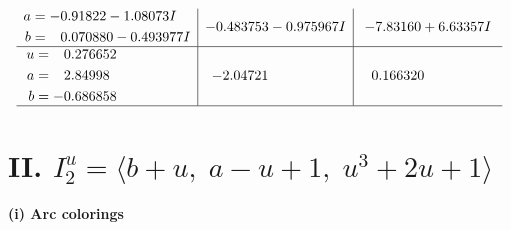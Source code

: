 \documentclass[1p]{elsarticle_modified}
\theoremstyle{definition}
\begin{document}
$$\begin{array}{c|c|c}
\begin{aligned}
a &= -0.91822 - 1.08073 I \\
b &= \phantom{-}0.070880 - 0.493977 I\end{aligned}
 & -0.483753 - 0.975967 I & -7.83160 + 6.63357 I \\ \hline\begin{aligned}
u &= \phantom{-}0.276652\phantom{ +0.000000I} \\
a &= \phantom{-}2.84998\phantom{ +0.000000I} \\
b &= -0.686858\phantom{ +0.000000I}\end{aligned}
 & -2.04721\phantom{ +0.000000I} & \phantom{-}0.166320\phantom{ +0.000000I}\\
 \hline 
 \end{array}$$\newpage\newpage\renewcommand{\arraystretch}{1}
\centering \section*{II. $I^u_{2}= \langle b+u,\;a- u+1,\;u^3+2 u+1 \rangle$}
\flushleft \textbf{(i) Arc colorings}\\
\end{document}
